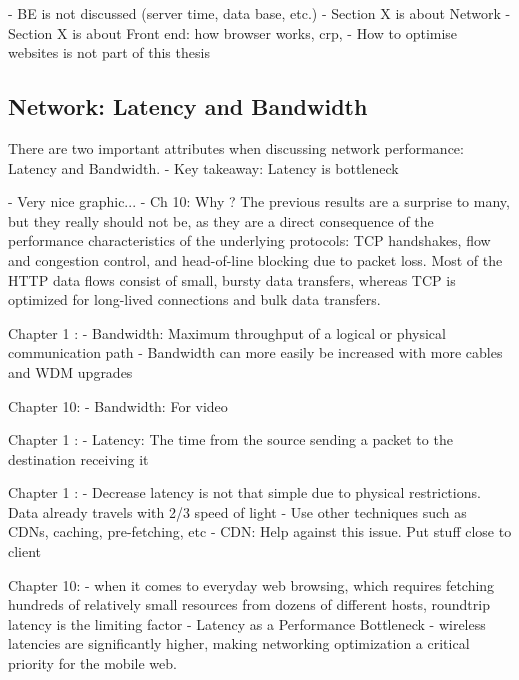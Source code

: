 - BE is not discussed (server time, data base, etc.)
- Section X is about Network
- Section X is about Front end: how browser works, crp, 
- How to optimise websites is not part of this thesis




\subsection{Network: Latency and Bandwidth}

There are two important attributes when discussing network performance: Latency and Bandwidth.
- Key takeaway: Latency is bottleneck

- Very nice graphic...
- Ch 10: Why ? The previous results are a surprise to many, but they really should not be, as they are a direct consequence of the performance characteristics of the underlying protocols: TCP handshakes, flow and congestion control, and head-of-line blocking due to packet loss. Most of the HTTP data flows consist of small, bursty data transfers, whereas TCP is optimized for long-lived connections and bulk data transfers.



Chapter 1 :
- Bandwidth: Maximum throughput of a logical or physical communication path
- Bandwidth can more easily be increased with more cables and WDM upgrades

Chapter 10:
- Bandwidth: For video



Chapter 1 :
- Latency: The time from the source sending a packet to the destination receiving it

Chapter 1 :
- Decrease latency is not that simple due to physical restrictions. Data already travels with 2/3 speed of light
- Use other techniques such as CDNs, caching, pre-fetching, etc
- CDN: Help against this issue. Put stuff close to client

Chapter 10:
- when it comes to everyday web browsing, which requires fetching hundreds of relatively small resources from dozens of different hosts, roundtrip latency is the limiting factor
- Latency as a Performance Bottleneck
-  wireless latencies are significantly higher, making networking optimization a critical priority for the mobile web.

